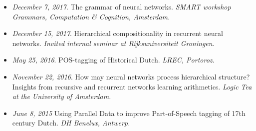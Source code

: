 \begin{itemize}
    \item \textit{December 7, 2017}. The grammar of neural networks. \textit{SMART workshop Grammars, Computation \& Cognition, Amsterdam.}
    \item \textit{December 15, 2017}. Hierarchical compositionality in recurrent neural networks. \textit{Invited internal seminar at Rijksuniversiteit Groningen.}
    \item \textit{May 25, 2016}. POS-tagging of Historical Dutch. \textit{LREC, Portoroz}.
    \item \textit{November 22, 2016}. How may neural networks process hierarchical structure? Insights from recursive and recurrent networks learning arithmetics. \textit{Logic Tea at the University of Amsterdam.}
    \item \textit{June 8, 2015} Using Parallel Data to improve Part-of-Speech tagging of 17th century Dutch. \textit{DH Benelux, Antwerp.}
\end{itemize}
